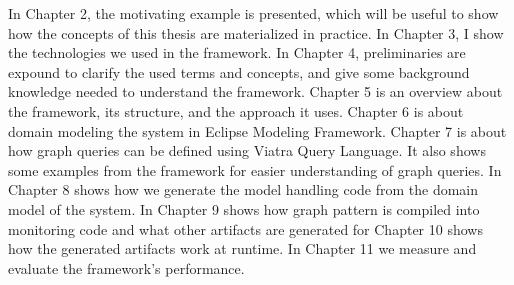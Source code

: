 	


In Chapter 2, the motivating example is presented, which will be useful to show how the concepts of this thesis are materialized in practice.
In Chapter 3, I show the technologies we used in the framework.
In Chapter 4, preliminaries are expound to clarify the used terms and concepts, and give some background knowledge needed to understand the framework.
Chapter 5 is an overview about the framework, its structure, and the approach it uses.
Chapter 6 is about domain modeling the system in Eclipse Modeling Framework.
Chapter 7 is about how graph queries can be defined using Viatra Query Language. It also shows some examples from the framework for easier understanding of graph queries.
In Chapter 8 shows how we generate the model handling code from the domain model of the system.
In Chapter 9 shows how graph pattern is compiled into monitoring code and what other artifacts are generated for 
Chapter 10 shows how the generated artifacts work at runtime. 
In Chapter 11 we measure and evaluate the framework's performance.


